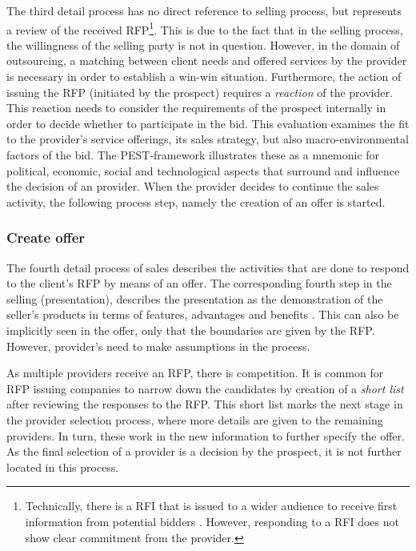 	The third detail process has no direct reference to selling process, but represents a review of the received \acrshort{RFP}\footnote{Technically, there is a \acrfull{RFI} that is issued to a wider audience to receive first information from potential bidders \citep{bitkom2008}. However, responding to a \acrshort{RFI} does not show clear commitment from the provider.}. This is due to the fact that in the selling process, the willingness of the selling party is not in question. However, in the domain of outsourcing, a matching between client needs and offered services by the provider is necessary in order to establish a win-win situation. Furthermore, the action of issuing the \acrshort{RFP} (initiated by the prospect) requires a \textit{reaction} of the provider. This reaction needs to consider the requirements of the prospect internally in order to decide whether to participate in the bid. This evaluation examines the fit to the provider's service offerings, its sales strategy, but also macro-environmental factors of the bid. The PEST-framework \citep{0314852336} illustrates these as a mnemonic for political, economic, social and technological aspects that surround and influence the decision of an provider. 
	When the provider decides to continue the sales activity, the following process step, namely the creation of an offer is started. 
	
	\subsubsection{Create offer}
	The fourth detail process of sales describes the activities that are done to respond  to the client's \acrshort{RFP} by means of an offer. The corresponding fourth step in the selling (presentation), describes the presentation as the demonstration of the seller's products in terms of features, advantages and benefits \citep{Moncrief_2005}. This can also be implicitly seen in the offer, only that the boundaries are given by the \acrshort{RFP}. However, provider's need to make assumptions in the process. 
	
	As multiple providers receive an \acrshort{RFP}, there is competition. It is common for \acrshort{RFP} issuing companies to narrow down the candidates by creation of a \textit{short list} after reviewing the responses to the \acrshort{RFP}. This short list marks the next stage in the provider selection process, where more details are given to the remaining providers. In turn, these work in the new information to further specify the offer. As the final selection of a provider is a decision by the prospect, it is not further located in this process. 
	
